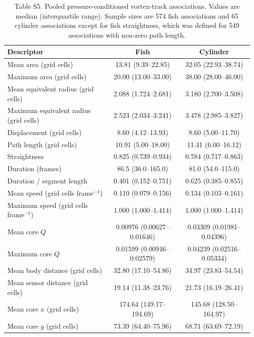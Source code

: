 \documentclass[11pt,a4paper]{article}
\begin{document}
\begin{landscape}
\begin{table}[p]
\centering
\caption*{Table S5. Pooled pressure-conditioned vortex-track associations. Values are median (interquartile range). Sample sizes are 574 fish associations and 65 cylinder associations except for fish straightness, which was defined for 549 associations with non-zero path length.}
\begin{tabular*}{0.8\linewidth}{@{\extracolsep{\fill}}lcc@{}}
\toprule
Descriptor & Fish & Cylinder \\
\midrule
Mean area (grid cells) & 13.81 (9.39--22.85) & 32.05 (22.93--38.74) \\
Maximum area (grid cells) & 20.00 (13.00--33.00) & 38.00 (28.00--46.00) \\
Mean equivalent radius (grid cells) & 2.088 (1.724--2.681) & 3.180 (2.700--3.508) \\
Maximum equivalent radius (grid cells) & 2.523 (2.034--3.241) & 3.478 (2.985--3.827) \\
Displacement (grid cells) & 8.60 (4.12--13.93) & 8.60 (5.00--11.70) \\
Path length (grid cells) & 10.91 (5.00--18.00) & 11.41 (6.00--16.12) \\
Straightness & 0.825 (0.739--0.934) & 0.784 (0.717--0.863) \\
Duration (frames) & 86.5 (36.0--165.0) & 81.0 (54.0--115.0) \\
Duration / segment length & 0.401 (0.152--0.751) & 0.625 (0.385--0.855) \\
Mean speed (grid cells frame$^{-1}$) & 0.110 (0.079--0.156) & 0.134 (0.103--0.161) \\
Maximum speed (grid cells frame$^{-1}$) & 1.000 (1.000--1.414) & 1.000 (1.000--1.414) \\
Mean core $Q$ & 0.00976 (0.00627--0.01646) & 0.03309 (0.01981--0.04396) \\
Maximum core $Q$ & 0.01599 (0.00946--0.02579) & 0.04239 (0.02516--0.05334) \\
Mean body distance (grid cells) & 32.80 (17.10--54.86) & 34.97 (23.83--54.54) \\
Mean sensor distance (grid cells) & 19.14 (11.38--23.76) & 21.73 (16.19--26.41) \\
Mean core $x$ (grid cells) & 174.64 (149.17--194.69) & 145.68 (128.50--164.97) \\
Mean core $y$ (grid cells) & 73.39 (64.40--75.96) & 68.71 (63.69--72.19) \\
\bottomrule
\end{tabular*}
\end{table}
\end{landscape}
\end{document}

